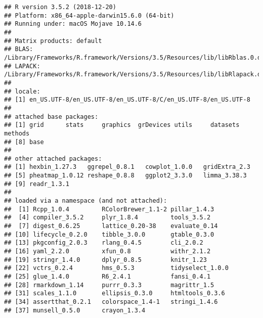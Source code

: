 \documentclass[]{article}
\begin{document}
\begin{verbatim}
## R version 3.5.2 (2018-12-20)
## Platform: x86_64-apple-darwin15.6.0 (64-bit)
## Running under: macOS Mojave 10.14.6
## 
## Matrix products: default
## BLAS: /Library/Frameworks/R.framework/Versions/3.5/Resources/lib/libRblas.0.dylib
## LAPACK: /Library/Frameworks/R.framework/Versions/3.5/Resources/lib/libRlapack.dylib
## 
## locale:
## [1] en_US.UTF-8/en_US.UTF-8/en_US.UTF-8/C/en_US.UTF-8/en_US.UTF-8
## 
## attached base packages:
## [1] grid      stats     graphics  grDevices utils     datasets  methods  
## [8] base     
## 
## other attached packages:
## [1] hexbin_1.27.3   ggrepel_0.8.1   cowplot_1.0.0   gridExtra_2.3  
## [5] pheatmap_1.0.12 reshape_0.8.8   ggplot2_3.3.0   limma_3.38.3   
## [9] readr_1.3.1    
## 
## loaded via a namespace (and not attached):
##  [1] Rcpp_1.0.4         RColorBrewer_1.1-2 pillar_1.4.3      
##  [4] compiler_3.5.2     plyr_1.8.4         tools_3.5.2       
##  [7] digest_0.6.25      lattice_0.20-38    evaluate_0.14     
## [10] lifecycle_0.2.0    tibble_3.0.0       gtable_0.3.0      
## [13] pkgconfig_2.0.3    rlang_0.4.5        cli_2.0.2         
## [16] yaml_2.2.0         xfun_0.8           withr_2.1.2       
## [19] stringr_1.4.0      dplyr_0.8.5        knitr_1.23        
## [22] vctrs_0.2.4        hms_0.5.3          tidyselect_1.0.0  
## [25] glue_1.4.0         R6_2.4.1           fansi_0.4.1       
## [28] rmarkdown_1.14     purrr_0.3.3        magrittr_1.5      
## [31] scales_1.1.0       ellipsis_0.3.0     htmltools_0.3.6   
## [34] assertthat_0.2.1   colorspace_1.4-1   stringi_1.4.6     
## [37] munsell_0.5.0      crayon_1.3.4
\end{verbatim}
\end{document}
